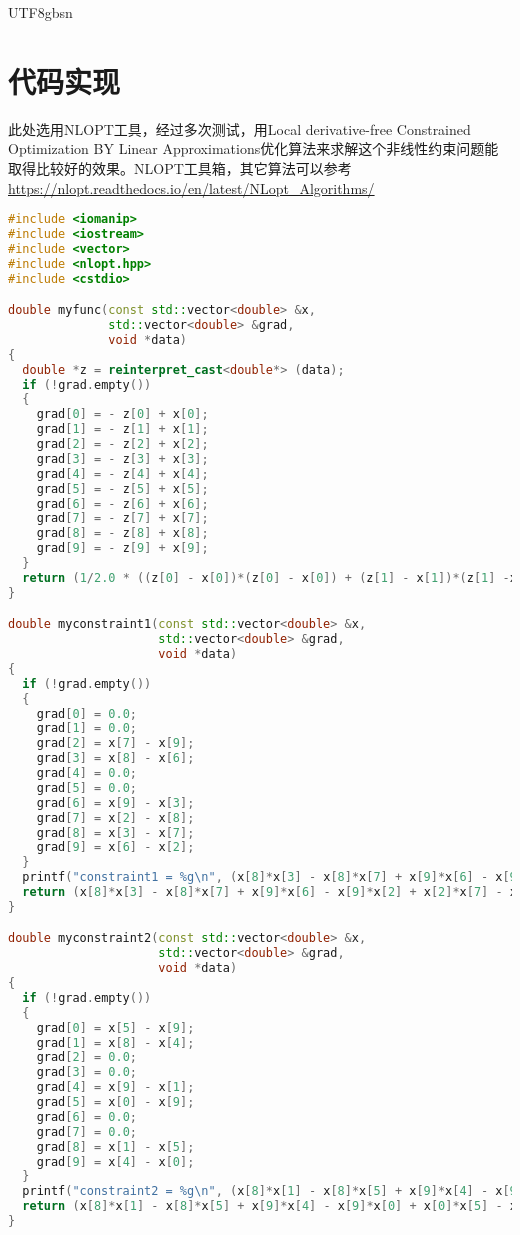 \documentclass[a4paper]{article}
\begin{document}
\begin{CJK*}{UTF8}{gbsn}
\section{代码实现}
此处选用NLOPT工具\cite{ref2}，经过多次测试，用Local derivative-free Constrained Optimization BY Linear Approximations\cite{ref3}\cite{ref4}优化算法来求解这个非线性约束问题能取得比较好的效果。NLOPT工具箱，其它算法可以参考\url{https://nlopt.readthedocs.io/en/latest/NLopt_Algorithms/}

\begin{lstlisting}[language=c++]
#include <iomanip>
#include <iostream>
#include <vector>
#include <nlopt.hpp>
#include <cstdio>

double myfunc(const std::vector<double> &x,
              std::vector<double> &grad,
              void *data)
{
  double *z = reinterpret_cast<double*> (data);
  if (!grad.empty())
  {
    grad[0] = - z[0] + x[0];
    grad[1] = - z[1] + x[1];
    grad[2] = - z[2] + x[2];
    grad[3] = - z[3] + x[3];
    grad[4] = - z[4] + x[4];
    grad[5] = - z[5] + x[5];
    grad[6] = - z[6] + x[6];
    grad[7] = - z[7] + x[7];
    grad[8] = - z[8] + x[8];
    grad[9] = - z[9] + x[9];
  }
  return (1/2.0 * ((z[0] - x[0])*(z[0] - x[0]) + (z[1] - x[1])*(z[1] -x[1]) + (z[2] - x[2])*(z[2] - x[2]) + (z[3] - x[3])*(z[3] - x[3]) + (z[4] - x[4])*(z[4] - x[4]) + (z[5] - x[5])*(z[5] - x[5]) + (z[6] - x[6])*(z[6] - x[6]) + (z[7] - x[7])*(z[7] - x[7]) + (z[8] - x[8])*(z[8] - x[8]) + (z[9] - x[9])*(z[9] - x[9])));
}

double myconstraint1(const std::vector<double> &x,
                     std::vector<double> &grad,
                     void *data)
{
  if (!grad.empty())
  {
    grad[0] = 0.0;
    grad[1] = 0.0;
    grad[2] = x[7] - x[9];
    grad[3] = x[8] - x[6];
    grad[4] = 0.0;
    grad[5] = 0.0;
    grad[6] = x[9] - x[3];
    grad[7] = x[2] - x[8];
    grad[8] = x[3] - x[7];
    grad[9] = x[6] - x[2];
  }
  printf("constraint1 = %g\n", (x[8]*x[3] - x[8]*x[7] + x[9]*x[6] - x[9]*x[2] + x[2]*x[7] - x[3]*x[6]));
  return (x[8]*x[3] - x[8]*x[7] + x[9]*x[6] - x[9]*x[2] + x[2]*x[7] - x[3]*x[6]);
}

double myconstraint2(const std::vector<double> &x,
                     std::vector<double> &grad,
                     void *data)
{
  if (!grad.empty())
  {
    grad[0] = x[5] - x[9];
    grad[1] = x[8] - x[4];
    grad[2] = 0.0;
    grad[3] = 0.0;
    grad[4] = x[9] - x[1];
    grad[5] = x[0] - x[9];
    grad[6] = 0.0;
    grad[7] = 0.0;
    grad[8] = x[1] - x[5];
    grad[9] = x[4] - x[0];
  }
  printf("constraint2 = %g\n", (x[8]*x[1] - x[8]*x[5] + x[9]*x[4] - x[9]*x[0] + x[0]*x[5] - x[1]*x[4]));
  return (x[8]*x[1] - x[8]*x[5] + x[9]*x[4] - x[9]*x[0] + x[0]*x[5] - x[1]*x[4]);
}


\end{lstlisting}
\end{CJK*}
\end{document}
